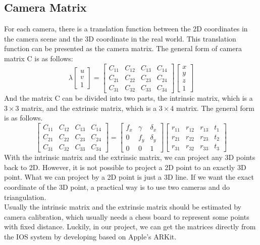 \documentclass[paper=a4, fontsize=14pt]{scrartcl}
\numberwithin{equation}{section}		%
\numberwithin{figure}{section}			%
\numberwithin{table}{section}				%
\begin{document}
\subsection{Camera Matrix}
For each camera, there is a translation function between the 2D coordinates in the camera scene and the 3D coordinate in the real world. This translation function can be presented as the camera matrix. The general form of camera matrix C is as follows:
$$\lambda\begin{bmatrix}u \\ v \\ 1\end{bmatrix}=
\begin{bmatrix}C_{11} & C_{12} & C_{13} & C_{14}\\
C_{21} & C_{22} & C_{23} & C_{24}\\
C_{31} & C_{32} & C_{33} & C_{34}\end{bmatrix} 
\begin{bmatrix}x \\ y \\ z\\ 1\end{bmatrix} $$
\indent And the matrix C can be divided into two parts, the intrinsic matrix, which is a $3\times 3$ matrix, and the extrinsic matrix, which is a $3\times 4$ matrix\cite{Hartley2004}. The general form is as follows.
$$\begin{bmatrix}C_{11} & C_{12} & C_{13} & C_{14}\\
C_{21} & C_{22} & C_{23} & C_{24}\\
C_{31} & C_{32} & C_{33} & C_{34}\end{bmatrix} = 
\begin{bmatrix}
f_x & \gamma & \delta_x\\
0 & f_y & \delta_y\\
0 & 0 & 1\end{bmatrix}
\begin{bmatrix}r_{11} & r_{12} & r_{13} & t_{1}\\
r_{21} & r_{22} & r_{23} & t_{2}\\
r_{31} & r_{32} & r_{33} & t_{3}\end{bmatrix}$$
\indent With the intrinsic matrix and the extrinsic matrix, we can project any 3D points back to 2D. However, it is not possible to project a 2D point to an exactly 3D point. What we can project by a 2D point is just a 3D line. If we want the exact coordinate of the 3D point, a practical way is to use two cameras and do triangulation.\\
\indent Usually the intrinsic matrix and the extrinsic matrix should be estimated by camera calibration, which usually needs a chess board to represent some points with fixed distance. 
Luckily, in our project, we can get the matrices directly from the IOS system by developing based on Apple's ARKit.
\end{document}
